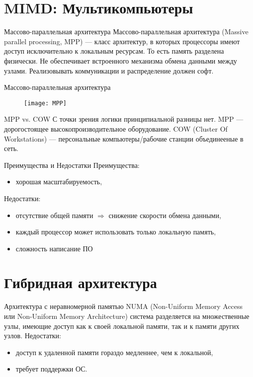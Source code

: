 \section{MIMD: Мультикомпьютеры}

\begin{frame}{Массово-параллельная архитектура}
Массово-параллельная архитектура (\abbr Massive parallel processing, MPP) --- класс архитектур, в которых процессоры имеют доступ исключительно к локальным ресурсам. То есть память разделена физически.
\vfill
Не обеспечивает встроенного механизма обмена данными между узлами. Реализовывать коммуникации и распределение должен софт.
\end{frame}

\begin{frame}{Массово-параллельная архитектура}
\begin{figure}[htpb]
    \centering
    \texttt{[image: MPP]}
\end{figure}
\end{frame}

\begin{frame}{MPP vs. COW}
\vfill
С точки зрения логики принципиальной разницы нет.
\vfill
MPP --- дорогостоящее высокопроизводительное оборудование.
\vfill
COW (Cluster Of Workstations) --- персональные компьютеры/рабочие станции
объединееные в сеть.
\end{frame}

\begin{frame}{Преимущества и Недостатки}
Преимущества:
\begin{itemize}
    \item хорошая масштабируемость,
\end{itemize}
\vfill
Недостатки:
\begin{itemize}
    \item отсутствие общей памяти $\Rightarrow$ снижение скорости обмена данными,
    \item каждый процессор может использовать только локальную память,
    \item сложность написание ПО
\end{itemize}
\end{frame}

\section{Гибридная архитектура}

\begin{frame}{Архитектура с неравномерной памятью}
NUMA (Non-Uniform Memory Access или Non-Uniform Memory Architecture) система разделяется на множественные узлы, имеющие доступ как к своей локальной памяти, так и к памяти других узлов.
\vfill
Недостатки:
\begin{itemize}
    \item доступ к удаленной памяти гораздо медленнее, чем к локальной,
    \item требует поддержки ОС.
\end{itemize}
\end{frame}

